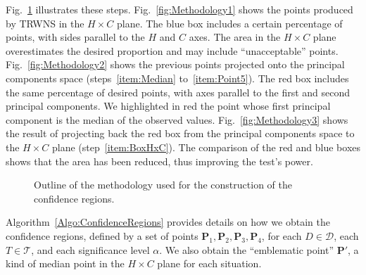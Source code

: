 Fig.~\ref{fig:methodology} illustrates these steps.
%
Fig.~\ref{fig:Methodology1} shows the points produced by TRWNS in the $H\times C$ plane.
The blue box includes a certain percentage of points, with sides parallel to the $H$ and $C$ axes.
The area in the $H\times C$ plane overestimates the desired proportion and may include ``unacceptable'' points.
%
Fig.~\ref{fig:Methodology2} shows the previous points projected onto the principal components space (steps~\ref{item:Median} to~\ref{item:Point5}).
The red box includes the same percentage of desired points, with axes parallel to the first and second principal components.
We highlighted in red the point whose first principal component is the median of the observed values.
%
Fig.~\ref{fig:Methodology3} shows the result of projecting back the red box from the principal components space to the $H\times C$ plane (step~\ref{item:BoxHxC}).
The comparison of the red and blue boxes shows that the area has been reduced, thus improving the test's power.

\begin{figure}[hbt]
	\centering
	\caption{Outline of the methodology used for the construction of the confidence regions.}
	\label{fig:methodology}
\end{figure}

Algorithm~\ref{Algo:ConfidenceRegions} provides details on how we obtain the confidence regions, defined by a set of points $\bm P_1, \bm P_2, \bm P_3, \bm P_4$, for each $D\in \mathcal D$, each $T\in \mathcal T$, and each significance level $\alpha$.
We also obtain the ``emblematic point'' $\bm P'$, a kind of median point in the $H\times C$ plane for each situation.


